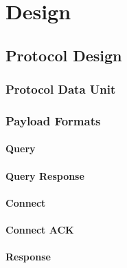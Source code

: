 \documentclass{l4proj}
\begin{document}


\chapter{Design} %
\label{cha:design}

\section{Protocol Design} %
\label{sec:protocol_design}


\subsection{Protocol Data Unit} %
\label{sub:protocol_data_unit}


\subsection{Payload Formats} %
\label{sub:payload_formats}

\subsubsection{Query} %
\label{ssub:query}
		

\subsubsection{Query Response} %
\label{ssub:query_response}


\subsubsection{Connect} %
\label{ssub:connect}


\subsubsection{Connect ACK} %
\label{ssub:connect_ack}


\subsubsection{Response} %
\label{ssub:response}
\end{document}
